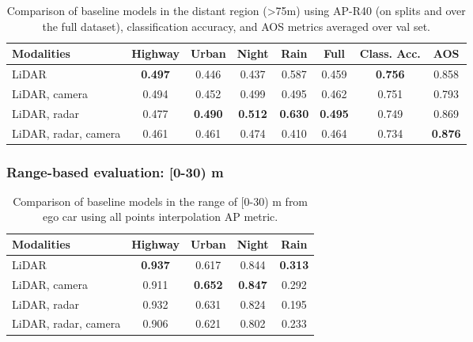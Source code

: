 \documentclass{article}
\begin{document}
\begin{table*}[!h]
  \small
  \centering
  \begin{tabular}{@{}l|ccccccc@{}}
    \toprule
    Modalities          & Highway   & Urban     & Night     & Rain      & Full      & Class. Acc.   & AOS\\
    \midrule
    LiDAR               & \bf{0.497}& 0.446     & 0.437     & 0.587     & 0.459     & \bf{0.756}    & 0.858 \\
    LiDAR, camera       & 0.494     & 0.452     & 0.499     & 0.495     & 0.462     & 0.751         & 0.793 \\
    LiDAR, radar        & 0.477     & \bf{0.490}& \bf{0.512}& \bf{0.630}& \bf{0.495}& 0.749         & 0.869 \\
    LiDAR, radar, camera & 0.461    & 0.461     & 0.474     & 0.410     & 0.464     & 0.734         & \bf{0.876} \\
    \bottomrule
  \end{tabular}
  \caption{Comparison of baseline models in the distant region (\textgreater75m) using AP-R40 (on splits and over the full dataset), classification accuracy, and AOS metrics averaged over val set.}
  \label{tab:metrics_distant}
\end{table*}

\newpage
\subsubsection{Range-based evaluation: [0-30) m}

\begin{table*}[!h]
  \small
  \centering
  \begin{tabular}{@{}l|cccc@{}}
    \toprule
    Modalities          & Highway   & Urban     & Night     & Rain  \\
    \midrule
    LiDAR               & \bf{0.937}& 0.617     & 0.844     & \bf{0.313} \\
    LiDAR, camera       & 0.911     & \bf{0.652}& \bf{0.847}& 0.292 \\
    LiDAR, radar        & 0.932     & 0.631     & 0.824     & 0.195 \\
    LiDAR, radar, camera & 0.906    & 0.621     & 0.802     & 0.233 \\
    \bottomrule
  \end{tabular}
  \caption{Comparison of baseline models in the range of [0-30) m from ego car using all points interpolation AP metric.}
  \label{tab:metrics0}
\end{table*}
\end{document}
